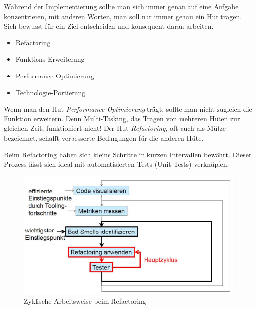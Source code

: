 Während der Implementierung sollte man sich immer genau auf eine Aufgabe konzentrieren, mit anderen Worten, man soll nur immer genau ein Hut tragen. Sich bewusst für ein Ziel entscheiden und konsequent daran arbeiten.

\begin{itemize}
	\item Refactoring
	\item Funktions-Erweiterung
	\item Performance-Optimierung
	\item Technologie-Portierung
\end{itemize}

Wenn man den Hut \textit{Performance-Optimierung} trägt, sollte man nicht zugleich die Funktion erweitern. Denn Multi-Tasking, das Tragen von mehreren Hüten zur gleichen Zeit, funktioniert nicht! Der Hut \textit{Refactoring}, oft auch als Mütze bezeichnet, schafft verbesserte Bedingungen für die anderen Hüte.

Beim Refactoring haben sich kleine Schritte in kurzen Intervallen bewährt. Dieser Prozess lässt sich ideal mit automatisierten Tests (Unit-Tests) verknüpfen.

\begin{figure}[h!]
\centering
\includegraphics[width=0.7\linewidth]{fig/zyklische-arbeitsweise-beim-refactoring}
\caption{Zyklische Arbeitsweise beim Refactoring}
\label{fig:zyklische-arbeitsweise-beim-refactoring}
\end{figure}

